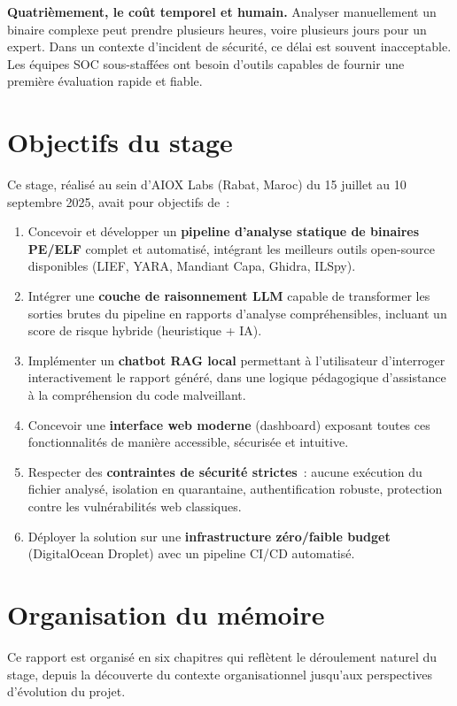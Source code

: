\textbf{Quatrièmement, le coût temporel et humain.} Analyser manuellement un binaire complexe peut prendre plusieurs heures, voire plusieurs jours pour un expert. Dans un contexte d'incident de sécurité, ce délai est souvent inacceptable. Les équipes SOC sous-staffées ont besoin d'outils capables de fournir une première évaluation rapide et fiable.

\section*{Objectifs du stage}

Ce stage, réalisé au sein d'AIOX Labs (Rabat, Maroc) du 15 juillet au 10 septembre 2025, avait pour objectifs de~:

\begin{enumerate}
  \item Concevoir et développer un \textbf{pipeline d'analyse statique de binaires PE/ELF} complet et automatisé, intégrant les meilleurs outils open-source disponibles (LIEF, YARA, Mandiant Capa, Ghidra, ILSpy).
  \item Intégrer une \textbf{couche de raisonnement LLM} capable de transformer les sorties brutes du pipeline en rapports d'analyse compréhensibles, incluant un score de risque hybride (heuristique + IA).
  \item Implémenter un \textbf{chatbot RAG local} permettant à l'utilisateur d'interroger interactivement le rapport généré, dans une logique pédagogique d'assistance à la compréhension du code malveillant.
  \item Concevoir une \textbf{interface web moderne} (dashboard) exposant toutes ces fonctionnalités de manière accessible, sécurisée et intuitive.
  \item Respecter des \textbf{contraintes de sécurité strictes}~: aucune exécution du fichier analysé, isolation en quarantaine, authentification robuste, protection contre les vulnérabilités web classiques.
  \item Déployer la solution sur une \textbf{infrastructure zéro/faible budget} (DigitalOcean Droplet) avec un pipeline CI/CD automatisé.
\end{enumerate}

\section*{Organisation du mémoire}

Ce rapport est organisé en six chapitres qui reflètent le déroulement naturel du stage, depuis la découverte du contexte organisationnel jusqu'aux perspectives d'évolution du projet.

